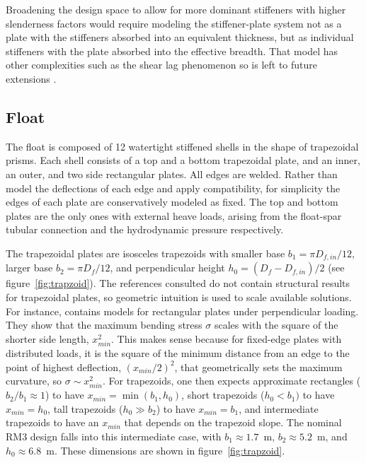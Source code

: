 Broadening the design space to allow for more dominant stiffeners with higher slenderness factors would require modeling the stiffener-plate system not as a plate with the stiffeners absorbed into an equivalent thickness, but as individual stiffeners with the plate absorbed into the effective breadth.
That model has other complexities such as the shear lag phenomenon so is left to future extensions \cite{wierzbicki_lecture_2013,american_iron_and_steel_institute_cold-formed_1991}.


\subsection{Float}
The float is composed of 12 watertight stiffened shells in the shape of trapezoidal prisms.
Each shell consists of a top and a bottom trapezoidal plate, and an inner, an outer, and two side rectangular plates.
All edges are welded.
Rather than model the deflections of each edge and apply compatibility, for simplicity the edges of each plate are conservatively modeled as fixed.
The top and bottom plates are the only ones with external heave loads, arising from the float-spar tubular connection and the hydrodynamic pressure respectively.

The trapezoidal plates are isosceles trapezoids with smaller base $b_1 = \pi D_{f,in}/12$, larger base $b_2=\pi D_f/12$, and perpendicular height $h_0=(D_f-D_{f,in})/2$ (see figure~\ref{fig:trapzoid}).
The references consulted do not contain structural results for trapezoidal plates, so geometric intuition is used to scale available solutions.
For instance, \cite{young_roarks_2001} contains models for rectangular plates under perpendicular loading.
They show that the maximum bending stress $\sigma$ scales with the square of the shorter side length, $x_{min}^2$. %
This makes sense because for fixed-edge plates with distributed loads, it is the square of the minimum distance from an edge to the point of highest deflection, $(x_{min}/2)^2$, that geometrically sets the maximum curvature, so $\sigma\sim x_{min}^2$.
For trapezoids, one then expects approximate rectangles ($b_2/b_1\approx1$) to have $x_{min}=\min(b_1,h_0)$, short trapezoids ($h_0<b_1)$ to have $x_{min}=h_0$, tall trapezoids ($h_0\gg b_2$) to have $x_{min}=b_1$, and intermediate trapezoids to have an $x_{min}$ that depends on the trapezoid slope.
The nominal RM3 design falls into this intermediate case, with $b_1\approx1.7$~m, $b_2\approx5.2$~m, and $h_0\approx6.8$~m.
These dimensions are shown in figure~\ref{fig:trapzoid}.

